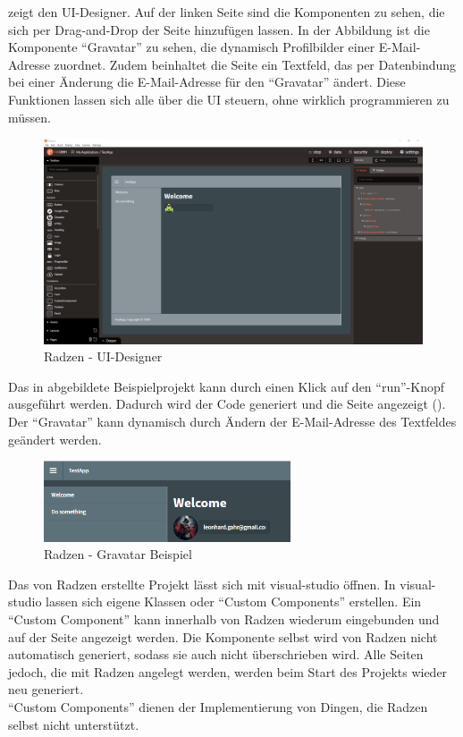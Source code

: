 \newpage\noindent {} zeigt den \gls{UI}-Designer. Auf der linken Seite sind die Komponenten zu sehen, die sich per Drag-and-Drop der Seite hinzufügen lassen. In der Abbildung ist die Komponente \enquote{Gravatar} zu sehen, die dynamisch Profilbilder einer E-Mail-Adresse zuordnet. Zudem beinhaltet die Seite ein Textfeld, das per Datenbindung bei einer Änderung die E-Mail-Adresse für den \enquote{Gravatar} ändert. Diese Funktionen lassen sich alle über die \gls{UI} steuern, ohne wirklich programmieren zu müssen.\\

\begin{figure}[htbp]
  \centering
  \includegraphics[width=\textwidth]{img/radzen_overview}
  \caption{\label{fig-radzen_overview}Radzen - \gls{UI}-Designer}
\end{figure}

\noindent Das in  abgebildete Beispielprojekt kann durch einen Klick auf den \enquote{run}-Knopf ausgeführt werden. Dadurch wird der Code generiert und die Seite angezeigt (). Der \enquote{Gravatar} kann dynamisch durch Ändern der E-Mail-Adresse des Textfeldes geändert werden.

\begin{figure}[htbp]
  \centering
  \includegraphics[width=0.65\textwidth]{img/radzen_example}
  \caption{\label{fig-radzen_example}Radzen - Gravatar Beispiel}
\end{figure}

\noindent Das von Radzen erstellte Projekt lässt sich mit \gls{visual-studio} öffnen. In \gls{visual-studio} lassen sich eigene Klassen oder \enquote{Custom Components} erstellen. Ein \enquote{Custom Component} kann innerhalb von Radzen wiederum eingebunden und auf der Seite angezeigt werden. Die Komponente selbst wird von Radzen nicht automatisch generiert, sodass sie auch nicht überschrieben wird. Alle Seiten jedoch, die mit Radzen angelegt werden, werden beim Start des Projekts wieder neu generiert.\\
\enquote{Custom Components} dienen der Implementierung von Dingen, die Radzen selbst nicht unterstützt.

